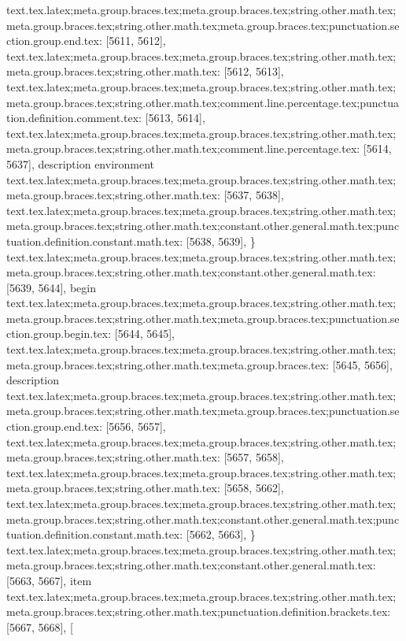 {{{{{{{{{{{{{{{{{{{{{{{{{{{{{{{{{{{{{{{{{{{{{{{{{{{{{{{{{{{{{{{{{{{{{{{{{{{{{{{{{{{{{{{{{{{{{{{{{{{{{{{{{{{{{{{{{{{{{{{{{{{{{{{{{{{{{{{{{{{{{{{{{{{{{{{{{{text.tex.latex;meta.group.braces.tex;meta.group.braces.tex;string.other.math.tex;meta.group.braces.tex;string.other.math.tex;meta.group.braces.tex;punctuation.section.group.end.tex: [5611, 5612], {}}
text.tex.latex;meta.group.braces.tex;meta.group.braces.tex;string.other.math.tex;meta.group.braces.tex;string.other.math.tex: [5612, 5613], {
}
text.tex.latex;meta.group.braces.tex;meta.group.braces.tex;string.other.math.tex;meta.group.braces.tex;string.other.math.tex;comment.line.percentage.tex;punctuation.definition.comment.tex: [5613, 5614], {%
text.tex.latex;meta.group.braces.tex;meta.group.braces.tex;string.other.math.tex;meta.group.braces.tex;string.other.math.tex;comment.line.percentage.tex: [5614, 5637], {description environment}
text.tex.latex;meta.group.braces.tex;meta.group.braces.tex;string.other.math.tex;meta.group.braces.tex;string.other.math.tex: [5637, 5638], {
}
text.tex.latex;meta.group.braces.tex;meta.group.braces.tex;string.other.math.tex;meta.group.braces.tex;string.other.math.tex;constant.other.general.math.tex;punctuation.definition.constant.math.tex: [5638, 5639], {\}
text.tex.latex;meta.group.braces.tex;meta.group.braces.tex;string.other.math.tex;meta.group.braces.tex;string.other.math.tex;constant.other.general.math.tex: [5639, 5644], {begin}
text.tex.latex;meta.group.braces.tex;meta.group.braces.tex;string.other.math.tex;meta.group.braces.tex;string.other.math.tex;meta.group.braces.tex;punctuation.section.group.begin.tex: [5644, 5645], {{}
text.tex.latex;meta.group.braces.tex;meta.group.braces.tex;string.other.math.tex;meta.group.braces.tex;string.other.math.tex;meta.group.braces.tex: [5645, 5656], {description}
text.tex.latex;meta.group.braces.tex;meta.group.braces.tex;string.other.math.tex;meta.group.braces.tex;string.other.math.tex;meta.group.braces.tex;punctuation.section.group.end.tex: [5656, 5657], {}}
text.tex.latex;meta.group.braces.tex;meta.group.braces.tex;string.other.math.tex;meta.group.braces.tex;string.other.math.tex: [5657, 5658], {
}
text.tex.latex;meta.group.braces.tex;meta.group.braces.tex;string.other.math.tex;meta.group.braces.tex;string.other.math.tex: [5658, 5662], {    }
text.tex.latex;meta.group.braces.tex;meta.group.braces.tex;string.other.math.tex;meta.group.braces.tex;string.other.math.tex;constant.other.general.math.tex;punctuation.definition.constant.math.tex: [5662, 5663], {\}
text.tex.latex;meta.group.braces.tex;meta.group.braces.tex;string.other.math.tex;meta.group.braces.tex;string.other.math.tex;constant.other.general.math.tex: [5663, 5667], {item}
text.tex.latex;meta.group.braces.tex;meta.group.braces.tex;string.other.math.tex;meta.group.braces.tex;string.other.math.tex;punctuation.definition.brackets.tex: [5667, 5668], {[}
}}}}}}}}}}}}}}}}}}}}}}}}}}}}}}}}}}}}}}}}}}}}}}}}}}}}}}}}}}}}}}}}}}}}}}}}}}}}}}}}}}}}}}}}}}}}}}}}}}}}}}}}}}}}}}}}}}}}}}}}}}}}}}}}}}}}}}}}}}}}}}}}}}}}}}}}}}}}
